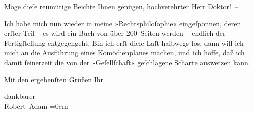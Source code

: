 \pstart
           Möge dieſe reumütige Beichte Ihnen genügen, hochverehrter Herr Doktor! –\pend
           
\pstart
           Ich habe mich nun wieder in meine »Rechtsphiloſophie« eingeſponnen, deren erſter Teil – es wird ein Buch von
               über 200 Seiten werden – endlich der Fertigſtellung entgegengeht. Bin ich erſt dieſe
               Laſt halbwegs los, dann will ich mich an die Ausführung eines Komödienplanes machen,
               und ich hoffe, daß ich damit ſeinerzeit die von der »Geſellſchaft« geſchlagene Scharte auswetzen kann.\pend
           
\pstart
           Mit den ergebenſten Grüßen Ihr\pend
           
\pstart
           dankbarer{\\[\baselineskip]}\spacefill\mbox{Robert Adam}\pend
           \leftskip=0em{}\endnumbering{}  
      